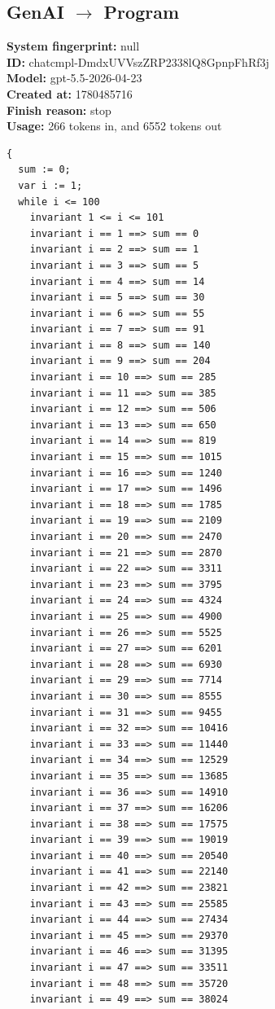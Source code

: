\documentclass{article}
\begin{document}
\subsection*{GenAI $\rightarrow$ Program}
\textbf{System fingerprint: }null
\\\textbf{ID: }chatcmpl-DmdxUVVszZRP2338lQ8GpnpFhRf3j
\\\textbf{Model: }gpt-5.5-2026-04-23
\\\textbf{Created at: }1780485716
\\\textbf{Finish reason: }stop
\\\textbf{Usage: }266 tokens in, and 6552 tokens out
\begin{lstlisting}
{
  sum := 0;
  var i := 1;
  while i <= 100
    invariant 1 <= i <= 101
    invariant i == 1 ==> sum == 0
    invariant i == 2 ==> sum == 1
    invariant i == 3 ==> sum == 5
    invariant i == 4 ==> sum == 14
    invariant i == 5 ==> sum == 30
    invariant i == 6 ==> sum == 55
    invariant i == 7 ==> sum == 91
    invariant i == 8 ==> sum == 140
    invariant i == 9 ==> sum == 204
    invariant i == 10 ==> sum == 285
    invariant i == 11 ==> sum == 385
    invariant i == 12 ==> sum == 506
    invariant i == 13 ==> sum == 650
    invariant i == 14 ==> sum == 819
    invariant i == 15 ==> sum == 1015
    invariant i == 16 ==> sum == 1240
    invariant i == 17 ==> sum == 1496
    invariant i == 18 ==> sum == 1785
    invariant i == 19 ==> sum == 2109
    invariant i == 20 ==> sum == 2470
    invariant i == 21 ==> sum == 2870
    invariant i == 22 ==> sum == 3311
    invariant i == 23 ==> sum == 3795
    invariant i == 24 ==> sum == 4324
    invariant i == 25 ==> sum == 4900
    invariant i == 26 ==> sum == 5525
    invariant i == 27 ==> sum == 6201
    invariant i == 28 ==> sum == 6930
    invariant i == 29 ==> sum == 7714
    invariant i == 30 ==> sum == 8555
    invariant i == 31 ==> sum == 9455
    invariant i == 32 ==> sum == 10416
    invariant i == 33 ==> sum == 11440
    invariant i == 34 ==> sum == 12529
    invariant i == 35 ==> sum == 13685
    invariant i == 36 ==> sum == 14910
    invariant i == 37 ==> sum == 16206
    invariant i == 38 ==> sum == 17575
    invariant i == 39 ==> sum == 19019
    invariant i == 40 ==> sum == 20540
    invariant i == 41 ==> sum == 22140
    invariant i == 42 ==> sum == 23821
    invariant i == 43 ==> sum == 25585
    invariant i == 44 ==> sum == 27434
    invariant i == 45 ==> sum == 29370
    invariant i == 46 ==> sum == 31395
    invariant i == 47 ==> sum == 33511
    invariant i == 48 ==> sum == 35720
    invariant i == 49 ==> sum == 38024

\end{lstlisting}
\end{document}
